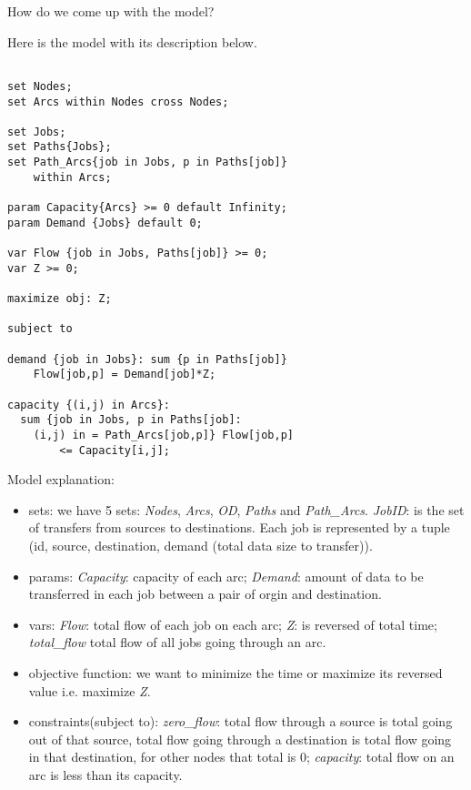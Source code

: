 How do we come up with the model?

Here is the model with its description below.

\begingroup
\fontsize{9pt}{9pt}\selectfont

\begin{verbatim}

set Nodes;
set Arcs within Nodes cross Nodes;

set Jobs;
set Paths{Jobs};
set Path_Arcs{job in Jobs, p in Paths[job]} 
    within Arcs;

param Capacity{Arcs} >= 0 default Infinity;
param Demand {Jobs} default 0;

var Flow {job in Jobs, Paths[job]} >= 0;
var Z >= 0;

maximize obj: Z;

subject to

demand {job in Jobs}: sum {p in Paths[job]} 
	Flow[job,p] = Demand[job]*Z;

capacity {(i,j) in Arcs}:
  sum {job in Jobs, p in Paths[job]: 
    (i,j) in = Path_Arcs[job,p]} Flow[job,p] 
		<= Capacity[i,j];

\end{verbatim}

\endgroup

Model explanation:
\begin{itemize}
\item sets: we have 5 sets: \textit{Nodes}, \textit{Arcs}, \textit{OD}, \textit{Paths} and \textit{Path\_Arcs}. \textit{JobID}: is the set of transfers from sources to destinations. Each job is represented by a tuple (id, source, destination, demand (total data size to transfer)).
\item params: {\it Capacity}: capacity of each arc; {\it Demand}: amount of data to be transferred in each job between a pair of orgin and destination.
\item vars: \textit{Flow}: total flow of each job on each arc; \textit{Z}: is reversed of total time; \textit{total\_flow} total flow of all jobs going through an arc.
\item objective function: we want to minimize the time or maximize its reversed value i.e. maximize \textit{Z}.
\item constraints(subject to): \textit{zero\_flow}: total flow through a source is total going out of that source, total flow going through a destination is total flow going in that destination, for other nodes that total is 0; \textit{capacity}: total flow on an arc is less than its capacity.
\end{itemize}

